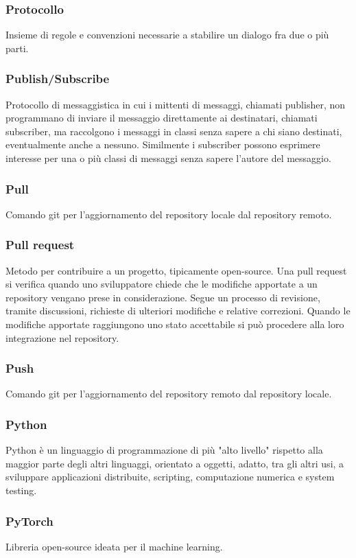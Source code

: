 \subsubsection*{Protocollo} Insieme di regole e convenzioni necessarie a stabilire un dialogo fra due o più parti.
\subsubsection*{Publish/Subscribe} Protocollo di messaggistica in cui i mittenti di messaggi, chiamati publisher, non programmano di inviare il messaggio direttamente ai destinatari, chiamati subscriber, ma raccolgono i messaggi in classi senza sapere a chi siano destinati, eventualmente anche a nessuno. Similmente i subscriber possono esprimere interesse per una o più classi di messaggi senza sapere l'autore del messaggio.
\subsubsection*{Pull} Comando git per l'aggiornamento del repository locale dal repository remoto.
\subsubsection*{Pull request} Metodo per contribuire a un progetto, tipicamente open-source. Una pull request si verifica quando uno sviluppatore chiede che le modifiche apportate a un repository vengano prese in considerazione. Segue un processo di revisione, tramite discussioni, richieste di ulteriori modifiche e relative correzioni. Quando le modifiche apportate raggiungono uno stato accettabile si può procedere alla loro integrazione nel repository.
\subsubsection*{Push} Comando git per l'aggiornamento del repository remoto dal repository locale.
\subsubsection*{Python} Python è un linguaggio di programmazione di più "alto livello" rispetto alla maggior parte degli altri linguaggi, orientato a oggetti, adatto, tra gli altri usi, a sviluppare applicazioni distribuite, scripting, computazione numerica e system testing.
\subsubsection*{PyTorch} Libreria open-source ideata per il machine learning.
